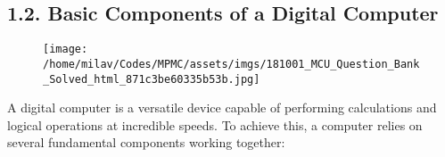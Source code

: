 \documentclass[
]{article}
\begin{document}
\hypertarget{12-basic-components-of-a-digital-computer}{%
\subsection{1.2. Basic Components of a Digital
Computer}\label{12-basic-components-of-a-digital-computer}}

\begin{figure}
\centering
\texttt{[image: /home/milav/Codes/MPMC/assets/imgs/181001\_MCU\_Question\_Bank\_Solved\_html\_871c3be60335b53b.jpg]}
\caption{}
\end{figure}

A digital computer is a versatile device capable of performing
calculations and logical operations at incredible speeds. To achieve
this, a computer relies on several fundamental components working
together:
\end{document}
